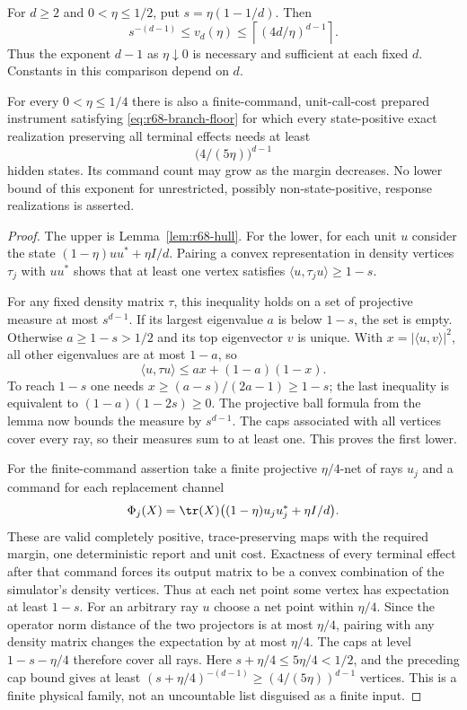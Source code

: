 \begin{theorem}\label{thm:r68-noise-exponent}
For $d\ge2$ and $0<\eta\le1/2$, put $s=\eta(1-1/d)$. Then
\begin{equation}\label{eq:r68-noise-count}
 s^{-(d-1)}\le v_d(\eta)
           \le\left\lceil(4d/\eta)^{d-1}\right\rceil.
\end{equation}
Thus the exponent $d-1$ as $\eta\downarrow0$ is necessary and sufficient at each fixed $d$. Constants in this comparison depend on $d$.

For every $0<\eta\le1/4$ there is also a finite-command, unit-call-cost prepared instrument satisfying \eqref{eq:r68-branch-floor} for which every state-positive exact realization preserving all terminal effects needs at least
\begin{equation}\label{eq:r68-finite-noise-lower}
 \bigl(4/(5\eta)\bigr)^{d-1}
\end{equation}
hidden states. Its command count may grow as the margin decreases. No lower bound of this exponent for unrestricted, possibly non-state-positive, response realizations is asserted.
\end{theorem}
\begin{proof}
The upper is Lemma~\ref{lem:r68-hull}. For the lower, for each unit $u$ consider the state $(1-\eta)uu^*+\eta I/d$. Pairing a convex representation in density vertices $\tau_j$ with $uu^*$ shows that at least one vertex satisfies $\langle u,\tau_ju\rangle\ge1-s$.

For any fixed density matrix $\tau$, this inequality holds on a set of projective measure at most $s^{d-1}$. If its largest eigenvalue $a$ is below $1-s$, the set is empty. Otherwise $a\ge1-s>1/2$ and its top eigenvector $v$ is unique. With $x=|\langle u,v\rangle|^2$, all other eigenvalues are at most $1-a$, so
\[
 \langle u,\tau u\rangle\le ax+(1-a)(1-x).
\]
To reach $1-s$ one needs $x\ge(a-s)/(2a-1)\ge1-s$; the last inequality is equivalent to $(1-a)(1-2s)\ge0$. The projective ball formula from the lemma now bounds the measure by $s^{d-1}$. The caps associated with all vertices cover every ray, so their measures sum to at least one. This proves the first lower.

For the finite-command assertion take a finite projective $\eta/4$-net of rays $u_j$ and a command for each replacement channel
\[
 \Phi_j(X)=\tr(X)\bigl((1-\eta)u_ju_j^*+\eta I/d\bigr).
\]
These are valid completely positive, trace-preserving maps with the required margin, one deterministic report and unit cost. Exactness of every terminal effect after that command forces its output matrix to be a convex combination of the simulator's density vertices. Thus at each net point some vertex has expectation at least $1-s$. For an arbitrary ray $u$ choose a net point within $\eta/4$. Since the operator norm distance of the two projectors is at most $\eta/4$, pairing with any density matrix changes the expectation by at most $\eta/4$. The caps at level $1-s-\eta/4$ therefore cover all rays. Here $s+\eta/4\le5\eta/4<1/2$, and the preceding cap bound gives at least $(s+\eta/4)^{-(d-1)}\ge(4/(5\eta))^{d-1}$ vertices. This is a finite physical family, not an uncountable list disguised as a finite input.
\end{proof}

